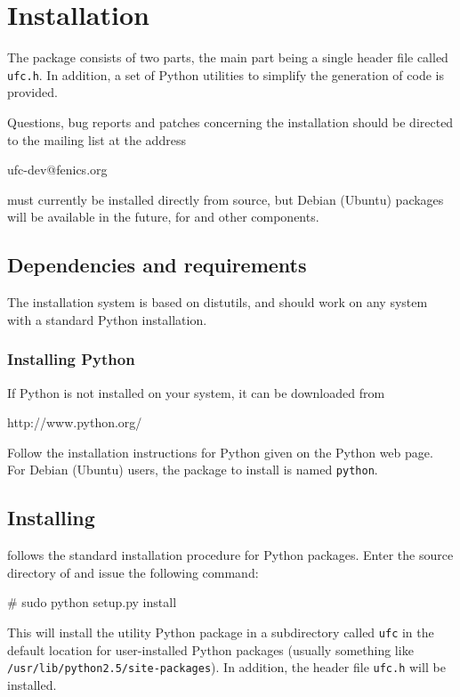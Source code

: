 \chapter{Installation}
\label{app:installation}

The \ufc{} package consists of two parts, the main part being a single
header file called \texttt{ufc.h}. In addition, a set of Python
utilities to simplify the generation of \ufc{} code is provided.

Questions, bug reports and patches concerning the installation should
be directed to the \ufc{} mailing list at the address
\begin{code}
ufc-dev@fenics.org
\end{code}

\ufc{} must currently be installed directly from source, but Debian
(Ubuntu) packages will be available in the future, for \ufc{} and
other \fenics{} components.

\section{Dependencies and requirements}

The installation system is based on distutils, and should work on any
system with a standard Python installation.

\subsection{Installing Python}

If Python is not installed on your system, it can be downloaded from
\begin{code}
http://www.python.org/
\end{code}
Follow the installation instructions for Python given on the Python
web page.  For Debian (Ubuntu) users, the package to install is named
\texttt{python}.

\section{Installing \ufc{}}

\ufc{} follows the standard installation procedure for Python
packages. Enter the source directory of \ufc{} and issue the following
command:
\begin{code}
# sudo python setup.py install
\end{code}
This will install the \ufc{} utility Python package in a subdirectory
called \texttt{ufc} in the default location for user-installed Python
packages (usually something like
\texttt{/usr/lib/python2.5/site-packages}). In addition, the header
file \texttt{ufc.h} will be installed.

